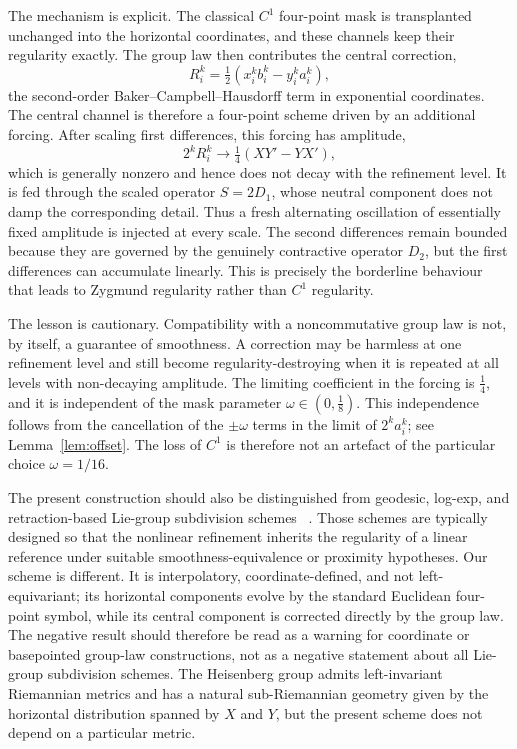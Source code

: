 \documentclass{article}
\theoremstyle{plain}
\theoremstyle{definition}
\begin{document}
The mechanism is explicit. The classical $C^1$ four-point mask is transplanted
unchanged into the horizontal coordinates, and these channels keep their
regularity exactly. The group law then contributes the central correction,
\[
R_i^k=\tfrac12(x_i^k b_i^k-y_i^k a_i^k),
\]
the second-order Baker--Campbell--Hausdorff term in exponential coordinates.
The central channel is therefore a four-point scheme driven by an additional
forcing. After scaling first differences, this forcing has amplitude,
\[
2^k R_i^k \longrightarrow \tfrac14(XY'-YX'),
\]
which is generally nonzero and hence does not decay with the refinement level.
It is fed through the scaled operator $S=2D_1$, whose neutral component does not
damp the corresponding detail. Thus a fresh alternating oscillation of
essentially fixed amplitude is injected at every scale. The second differences
remain bounded because they are governed by the genuinely contractive operator
$D_2$, but the first differences can accumulate linearly. This is precisely the
borderline behaviour that leads to Zygmund regularity rather than $C^1$
regularity.

The lesson is cautionary. Compatibility with a noncommutative group law is not,
by itself, a guarantee of smoothness. A correction may be harmless at one
refinement level and still become regularity-destroying when it is repeated at
all levels with non-decaying amplitude. The limiting coefficient in the forcing
is $\tfrac14$, and it is independent of the mask parameter
$\omega\in(0,\tfrac18)$. This independence follows from the cancellation of the
$\pm\omega$ terms in the limit of $2^k a_i^k$; see Lemma~\ref{lem:offset}. The
loss of $C^1$ is therefore not an artefact of the particular choice
$\omega=1/16$.

The present construction should also be distinguished from geodesic,
log-exp, and retraction-based Lie-group subdivision schemes
~\cite{ParkRavani95, CrouchLeite95, CrouchKunLeite99, NavYazPol13,
WallnerNYGrohs07, XieYu10, NavYazYu11, DuchampXieYu13}. Those schemes are
typically designed so that the nonlinear refinement inherits the regularity of
a linear reference under suitable smoothness-equivalence or proximity
hypotheses. Our scheme is different. It is interpolatory, coordinate-defined,
and not left-equivariant; its horizontal components evolve by the standard
Euclidean four-point symbol, while its central component is corrected directly
by the group law. The negative result should therefore be read as a warning for
coordinate or basepointed group-law constructions, not as a negative statement
about all Lie-group subdivision schemes. The Heisenberg group admits
left-invariant Riemannian metrics and has a natural sub-Riemannian geometry
given by the horizontal distribution spanned by $X$ and $Y$, but the present
scheme does not depend on a particular metric.
\end{document}
